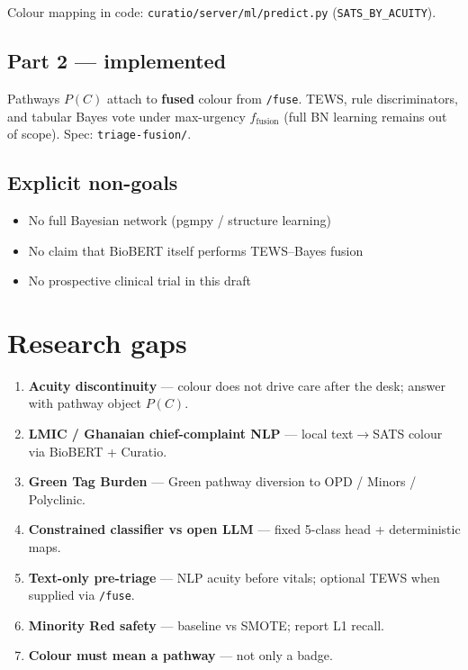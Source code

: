 \documentclass[11pt,a4paper]{article}
\begin{document}
Colour mapping in code: \texttt{curatio/server/ml/predict.py} (\texttt{SATS\_BY\_ACUITY}).

\subsection*{Part 2 --- implemented}
Pathways \(P(C)\) attach to \textbf{fused} colour from \texttt{/fuse}. TEWS, rule discriminators, and tabular Bayes vote under max-urgency \(f_{\mathrm{fusion}}\) (full BN learning remains out of scope). Spec: \texttt{triage-fusion/}.

\subsection*{Explicit non-goals}
\begin{itemize}
  \item No full Bayesian network (pgmpy / structure learning)
  \item No claim that BioBERT itself performs TEWS--Bayes fusion
  \item No prospective clinical trial in this draft
\end{itemize}

\section{Research gaps}
\begin{enumerate}
  \item \textbf{Acuity discontinuity} --- colour does not drive care after the desk; answer with pathway object $P(C)$.
  \item \textbf{LMIC / Ghanaian chief-complaint NLP} --- local text$\to$SATS colour via BioBERT + Curatio.
  \item \textbf{Green Tag Burden} --- Green pathway diversion to OPD / Minors / Polyclinic.
  \item \textbf{Constrained classifier vs open LLM} --- fixed 5-class head + deterministic maps.
  \item \textbf{Text-only pre-triage} --- NLP acuity before vitals; optional TEWS when supplied via \texttt{/fuse}.
  \item \textbf{Minority Red safety} --- baseline vs SMOTE; report L1 recall.
  \item \textbf{Colour must mean a pathway} --- not only a badge.
\end{enumerate}
\end{document}
